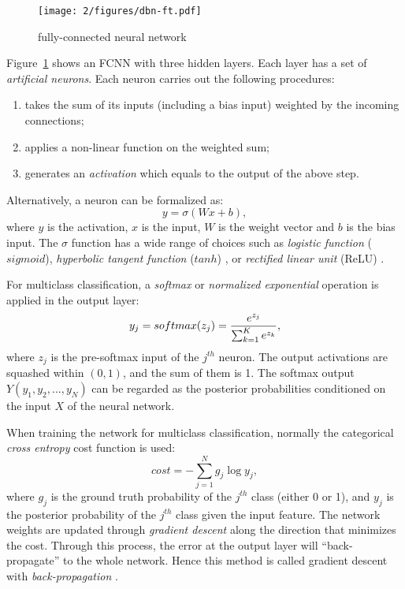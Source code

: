 \begin{figure}[htb]
\centering
\texttt{[image: 2/figures/dbn-ft.pdf]}
\caption{fully-connected neural network}
\label{fig:2-dbn-ft}
\end{figure}
Figure~\ref{fig:2-dbn-ft} shows an FCNN with three hidden layers. Each layer has a set of {\it artificial neurons}. Each neuron carries out the following procedures:
\begin{enumerate}
\item takes the sum of its inputs (including a bias input) weighted by the incoming connections;
\item applies a non-linear function on the weighted sum;
\item generates an {\it activation} which equals to the output of the above step.
\end{enumerate}
Alternatively, a neuron can be formalized as:
\begin{equation}
y = \sigma(Wx+b),
\end{equation}
where $y$ is the activation, $x$ is the input, $W$ is the weight vector and $b$ is the bias input. The $\sigma$ function has a wide range of choices \cite{sigtia2014improved} such as {\it logistic function} ($sigmoid$), {\it hyperbolic tangent function} ($tanh$) \cite{lecun2012efficient}, or {\it rectified linear unit} (ReLU) \cite{hahnloser2000digital}.

For multiclass classification, a {\it softmax} or {\it normalized exponential} operation is applied in the output layer:
\begin{equation}
y_j = softmax(z_j)={e^{z_j} \over \sum_{k=1}^K e^{z_k}},
\end{equation}
where $z_j$ is the pre-softmax input of the $j^{th}$ neuron. The output activations are squashed within $(0,1)$, and the sum of them is 1. The softmax output $Y(y_1,y_2,...,y_N)$ can be regarded as the posterior probabilities conditioned on the input $X$ of the neural network.

When training the network for multiclass classification, normally the categorical {\it cross entropy} cost function \cite{murphy2012machine} is used:
\begin{equation}\label{eq:2-crossentropy}
cost = -\sum_{j=1}^N g_j\log y_j,
\end{equation}
where $g_j$ is the ground truth probability of the $j^{th}$ class (either 0 or 1), and $y_j$ is the posterior probability of the $j^{th}$ class given the input feature. The network weights are updated through \textit{gradient descent} along the direction that minimizes the cost. Through this process, the error at the output layer will ``back-propagate'' to the whole network. Hence this method is called gradient descent with {\it back-propagation} \cite{rumelhart1988learning}.

